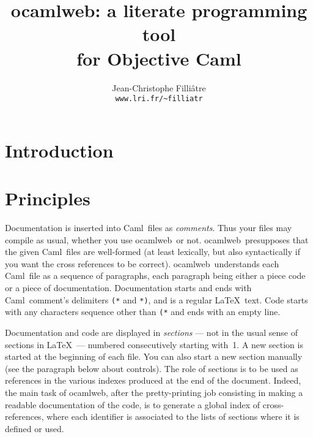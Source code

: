 \documentclass[12pt]{article}
\newcommand{\Caml}{\textsf{Caml}}
\newcommand{\ocamlweb}{\textsf{ocamlweb}}
\begin{document}
\title{ocamlweb: a literate programming tool \\ 
               for Objective Caml}
\author{Jean-Christophe Filli\^{a}tre \\
        \normalsize\texttt{www.lri.fr/\~{}filliatr}}
\date{}
\maketitle

\section{Introduction}


\section{Principles}

Documentation is inserted into \Caml\ files as \emph{comments}.  Thus
your files may compile as usual, whether you use \ocamlweb\ or not.
\ocamlweb\ presupposes that the given \Caml\ files are well-formed (at
least lexically, but also syntactically if you want the cross
references to be correct).  \ocamlweb\ understands each \Caml\ file as
a sequence of paragraphs, each paragraph being either a piece code or a
piece of documentation.  Documentation starts and ends with \Caml\ 
comment's delimiters \texttt{(*} and \texttt{*)}, and is a regular
\LaTeX\ text. Code starts with any characters sequence other than
\texttt{(*} and ends with an empty line.

Documentation and code are displayed in \emph{sections} --- not in the
usual sense of sections in \LaTeX\ --- numbered
consecutively starting with~1. A new section is started at the
beginning of each file. You can also start a new section manually (see
the paragraph below about controls). The role of sections is to be
used as references in the various indexes produced at the end of the
document.
Indeed, the main task of \ocamlweb, after the pretty-printing job
consisting in making a readable documentation of the code, is to
generate a global index of cross-references, where each identifier is
associated to the lists of sections where it is defined or used.
\end{document}
